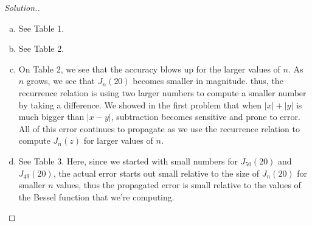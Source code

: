 \documentclass[10pt]{article}
\begin{document}
\begin{proof}[Solution.]
\begin{enumerate}[(a)]
\item See Table 1.
\item See Table 2.
\item On Table 2, we see that the accuracy blows up for the larger values of $n$. As $n$ grows, we see that $ J_n(20) $ becomes smaller in magnitude. thus, the recurrence relation is using two larger numbers to compute a smaller number by taking a difference. We showed in the first problem that when $ |x| + |y| $ is much bigger than $ |x - y| $, subtraction becomes sensitive and prone to error. All of this error continues to propagate as we use the recurrence relation to compute $ J_n(z) $ for larger values of $n$.
\item See Table 3. Here, since we started with small numbers for $ J_{50}(20) $ and $ J_{49}(20) $, the actual error starts out small relative to the size of $ J_n(20) $ for smaller $n$ values, thus the propagated error is small relative to the values of the Bessel function that we're computing.
\end{enumerate}
\end{proof}
\end{document}
